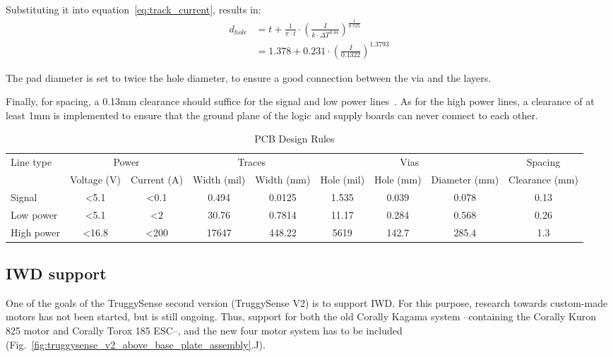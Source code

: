 \documentclass[conference,a4paper]{IEEEtran}
\let\oldsubsection\subsection
\renewcommand{\subsection}[1]{
  \setlength{\parskip}{0.5em}
  \setlength{\parindent}{0pt}
  \oldsubsection{#1}
}
\newcommand{\ParagraphSeperator}{
  \setlength{\parskip}{0em}
  \setlength{\parindent}{10pt}
}
\begin{document}
\noindent Substituting it into equation~\ref{eq:track_current}, results in:
\begin{align}
    d_{hole} & = t + \frac{1}{\pi \cdot t} \cdot \left(\frac{I}{k \cdot \Delta T^{0.44}}\right)^{\frac{1}{0.725}} \\
	\label{eq:via_current}
             & = 1.378 + 0.231 \cdot \left(\frac{I}{0.1322}\right)^{1.3793}
\end{align}

\noindent The pad diameter is set to twice the hole diameter, to ensure a good connection between the via and the layers.

\ParagraphSeperator
Finally, for spacing, a 0.13mm clearance should suffice for the signal and low power lines~\cite{Daems2023}.
As for the high power lines, a clearance of at least 1mm is implemented to ensure that the ground plane of the logic and supply boards can never connect to each other.

\begin{table}[!t]
	\centering
	\caption{PCB Design Rules}
	\begin{tabular}{lcccccccc}
		\toprule
			Line type & \multicolumn{2}{c}{Power}   						& \multicolumn{2}{c}{Traces} 					     & \multicolumn{3}{c}{Vias}   						                             & Spacing \\
					  &	\scriptsize{Voltage (V)} & \scriptsize{Current (A)} & \scriptsize{Width (mil)} & \scriptsize{Width (mm)} & \scriptsize{Hole (mil)}  & \scriptsize{Hole (mm)} & \scriptsize{Diameter (mm)} & \scriptsize{Clearance (mm)} \\
		\cmidrule(lr){2-3}\cmidrule(lr){4-5}\cmidrule(lr){6-8}\cmidrule(lr){9-9}
			Signal     & \textless 5.1  & \textless 0.1 & 0.494 & 0.0125 & 1.535 & 0.039 & 0.078 & 0.13 \\
			Low power  & \textless 5.1  & \textless 2   & 30.76 & 0.7814 & 11.17 & 0.284 & 0.568 & 0.26 \\
			High power & \textless 16.8 & \textless 200 & 17647 & 448.22 & 5619  & 142.7 & 285.4 & 1.3  \\
		\bottomrule
	\end{tabular}
	\label{tab:pcb_design_rules}
\end{table}

\subsection{IWD support}
\ParagraphSeperator
One of the goals of the TruggySense second version (TruggySense V2) is to support IWD.
For this purpose, research towards custom-made motors has not been started, but is still ongoing.
Thus, support for both the old Corally Kagama system --containing the Corally Kuron 825 motor and Corally Torox 185 ESC--, and the new four motor system has to be included (Fig.~\ref{fig:truggysense_v2_above_base_plate_assembly}.J).
\end{document}
